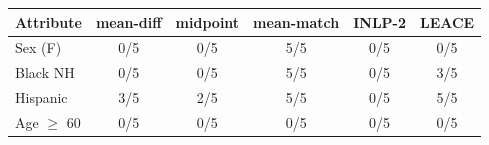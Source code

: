 \begin{tabular}{lccccc}
\toprule
Attribute & mean-diff & midpoint & mean-match & INLP-2 & LEACE \\
\midrule
Sex (F) & 0/5 & 0/5 & 5/5 & 0/5 & 0/5 \\
Black NH & 0/5 & 0/5 & 5/5 & 0/5 & 3/5 \\
Hispanic & 3/5 & 2/5 & 5/5 & 0/5 & 5/5 \\
Age $\geq$ 60 & 0/5 & 0/5 & 0/5 & 0/5 & 0/5 \\
\bottomrule
\end{tabular}
